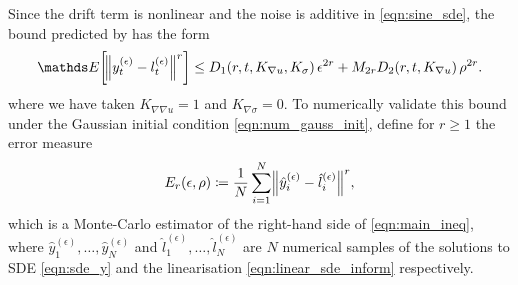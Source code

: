 Since the drift term is nonlinear and the noise is additive in \cref{eqn:sine_sde}, the bound predicted by  has the form
\[
	\avg{\norm{y_t^{(\epsilon)} - l_t^{(\epsilon)}}^r} \leq D_1\!\left(r,t, K_{\nabla u}, K_\sigma\right)\epsilon^{2r} + M_{2r}D_2\!\left(r,t, K_{\nabla u}\right)\rho^{2r}.
\]
where we have taken \(K_{\nabla\nabla u} = 1\) and \(K_{\nabla\sigma} = 0\).
To numerically validate this bound under the Gaussian initial condition \cref{eqn:num_gauss_init}, define for \(r \geq 1\) the error measure
\begin{equation}
	E_r\!\left(\epsilon, \rho\right) \coloneqq \frac{1}{N}\sum_{i=1}^N{\norm{\hat{y}_{i}^{(\epsilon)} - \hat{l}_i^{(\epsilon)}}^r},
	\label{eqn:strong_err_mc_estimate}
\end{equation}
which is a Monte-Carlo estimator of the right-hand side of \cref{eqn:main_ineq}, where \(\hat{y}_1^{(\epsilon)},\dotsc, \hat{y}_N^{(\epsilon)}\) and \(\hat{l}_1^{(\epsilon)},\dotsc, \hat{l}_N^{(\epsilon)}\) are \(N\) numerical samples of the solutions to SDE \cref{eqn:sde_y} and the linearisation \cref{eqn:linear_sde_inform} respectively.

